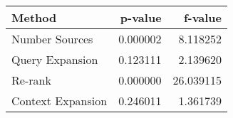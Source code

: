 \begin{tabular}{lrr}
\toprule
Method & p-value & f-value \\
\midrule
Number Sources & 0.000002 & 8.118252 \\
Query Expansion & 0.123111 & 2.139620 \\
Re-rank & 0.000000 & 26.039115 \\
Context Expansion & 0.246011 & 1.361739 \\
\bottomrule
\end{tabular}
